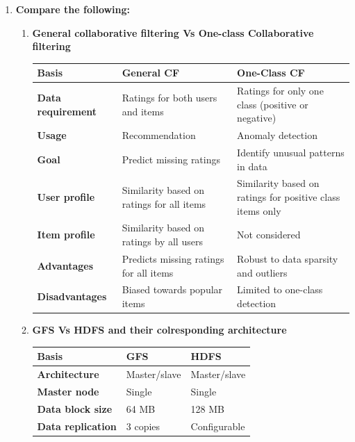 \documentclass[12pt]{article}
\begin{document}
\begin{enumerate}
    \item {\bfseries Compare the following:}
    \begin{enumerate}
        \item {\bfseries General collaborative filtering Vs One-class Collaborative filtering\\}
            \begin{longtable}{|L{3cm}|L{5cm}|L{5cm}|}
            \hline
            \textbf{Basis} & \textbf{General CF} & \textbf{One-Class CF} \\
            \hline
            \textbf{Data requirement} & Ratings for both users and items & Ratings for only one class (positive or negative) \\
            \hline
            \textbf{Usage} & Recommendation & Anomaly detection \\
            \hline
            \textbf{Goal} & Predict missing ratings & Identify unusual patterns in data \\
            \hline
            \textbf{User profile} & Similarity based on ratings for all items & Similarity based on ratings for positive class items only \\
            \hline
            \textbf{Item profile} & Similarity based on ratings by all users & Not considered \\
            \hline
            \textbf{Advantages} & Predicts missing ratings for all items & Robust to data sparsity and outliers \\
            \hline
            \textbf{Disadvantages} & Biased towards popular items & Limited to one-class detection \\
            \hline
            \end{longtable}
        \item {\bfseries GFS Vs HDFS and their colresponding architecture}
        \begin{longtable}{|L{3cm}|L{5cm}|L{5cm}|}
            \hline
            \textbf{Basis} & \textbf{GFS} & \textbf{HDFS} \\
            \hline
            \textbf{Architecture} & Master/slave & Master/slave \\
            \hline
            \textbf{Master node} & Single & Single \\
            \hline
            \textbf{Data block size} & 64 MB & 128 MB \\
            \hline
            \textbf{Data replication} & 3 copies & Configurable \\

\end{longtable}
\end{enumerate}
\end{enumerate}
\end{document}
